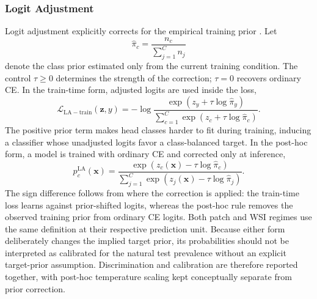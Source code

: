 \documentclass[11pt]{article}
\begin{document}
\subsubsection{Logit Adjustment}
Logit adjustment explicitly corrects for the empirical training prior \citep{menon2021longTail}. Let
\begin{equation}
  \widehat{\pi}_c=\frac{n_c}{\sum_{j=1}^{C}n_j}
  \label{eq:empirical-prior}
\end{equation}
denote the class prior estimated only from the current training condition. The control $\tau\geq0$ determines the strength of the correction; $\tau=0$ recovers ordinary CE. In the train-time form, adjusted logits are used inside the loss,
\begin{equation}
  \mathcal{L}_{\mathrm{LA-train}}(\mathbf z,y)
  =-\log\frac{\exp(z_y+\tau\log\widehat{\pi}_y)}
  {\sum_{c=1}^{C}\exp(z_c+\tau\log\widehat{\pi}_c)}.
  \label{eq:logit-adjustment-train}
\end{equation}
The positive prior term makes head classes harder to fit during training, inducing a classifier whose unadjusted logits favor a class-balanced target. In the post-hoc form, a model is trained with ordinary CE and corrected only at inference,
\begin{equation}
  p_c^{\mathrm{LA}}(\mathbf x)=
  \frac{\exp(z_c(\mathbf x)-\tau\log\widehat{\pi}_c)}
  {\sum_{j=1}^{C}\exp(z_j(\mathbf x)-\tau\log\widehat{\pi}_j)}.
  \label{eq:logit-adjustment-posthoc}
\end{equation}
The sign difference follows from where the correction is applied: the train-time loss learns against prior-shifted logits, whereas the post-hoc rule removes the observed training prior from ordinary CE logits. Both patch and WSI regimes use the same definition at their respective prediction unit. Because either form deliberately changes the implied target prior, its probabilities should not be interpreted as calibrated for the natural test prevalence without an explicit target-prior assumption. Discrimination and calibration are therefore reported together, with post-hoc temperature scaling kept conceptually separate from prior correction.
\end{document}

